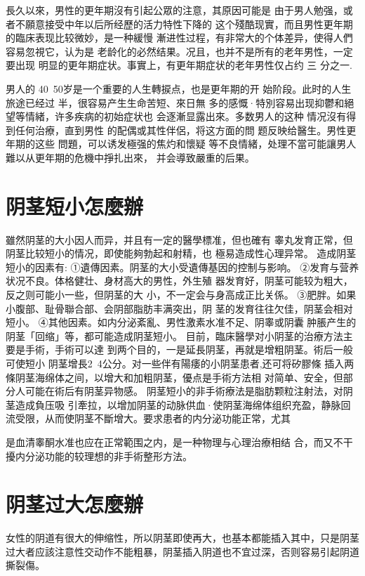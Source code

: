 \documentclass[12pt,UTF8]{ctexbook}
\begin{document}
長久以來，男性的更年期沒有引起公眾的注意，其原因可能是
由于男人勉强，或者不願意接受中年以后所经歷的活力特性下降的
这个殘酷现實，而且男性更年期的臨床表现比较微妙，是一种緩慢
漸进性过程，有非常大的个体差异，使得人們容易忽視它，认为是
老龄化的必然结果。况且，也并不是所有的老年男性，一定要出现
明显的更年期症状。事實上，有更年期症状的老年男性仅占约 三
分之一.

男人的 40~50岁是一个重要的人生轉捩点，也是更年期的开
始阶段。此时的人生旅途已经过
半，很容易产生生命苦短、來日無
多的感慨·特別容易出现抑鬱和絕
望等情緒，许多疾病的初始症状也
会逐漸显露出來。多数男人的这种
情况沒有得到任何治療，直到男性
的配偶或其性伴侶，将这方面的問
题反映给醫生。男性更年期的这些
問題，可以诱发極强的焦灼和懷疑
等不良情緒，处理不當可能讓男人
難以从更年期的危機中掙扎出來，
并会導致嚴重的后果。

\section{阴茎短小怎麼辦}

雖然阴茎的大小因人而异，并且有一定的醫學標准，但也確有
睾丸发育正常，但阴茎比较短小的情况，即使能夠勃起和射精，也
極易造成性心理异常。
造成阴茎短小的因素有:
①遺傳因素。阴茎的大小受遺傳基因的控制与影响。
②发育与营养状况不良。体格健壮、身材高大的男性，外生殖
器发育好，阴茎可能较为粗大，反之则可能小一些，但阴茎的大
小，不一定会与身高成正比关係。
③肥胖。如果小腹部、耻骨聯合部、会阴部脂肪丰满突出，阴
茎的发育往往欠佳，阴茎会相对短小。
④其他因素。如内分泌紊亂、男性激素水准不足、阴睾或阴囊
肿脹产生的阴茎「回缩」等，都可能造成阴茎短小。
目前，臨床醫學对小阴茎的治療方法主要是手術，手術可以達
到两个目的，一是延長阴茎，再就是增粗阴茎。術后一般可使短小
阴茎增長2~4公分。对一些伴有陽痿的小阴茎患者,还可将矽膠條
插入两條阴茎海绵体之间，以增大和加粗阴茎，優点是手術方法相
对简单、安全，但部分人可能在術后有阴茎异物感。
阴茎短小的非手術療法是脂肪颗粒注射法，对阴茎造成負压吸
引牽拉，以增加阴茎的动脉供血·使阴茎海绵体组织充盈，静脉回
流受限，从而使阴茎不斷增大。要求患者的内分泌功能正常，尤其

是血清睾酮水准也应在正常範围之内，是一种物理与心理治療相结
合，而又不干擾内分泌功能的较理想的非手術整形方法。

\section{阴茎过大怎麼辦}

女性的阴道有很大的伸缩性，所以阴茎即使再大，也基本都能插入其中，只是阴茎过大者应該注意性交动作不能粗暴，阴茎插入阴道也不宜过深，否则容易引起阴道撕裂傷。
\end{document}
